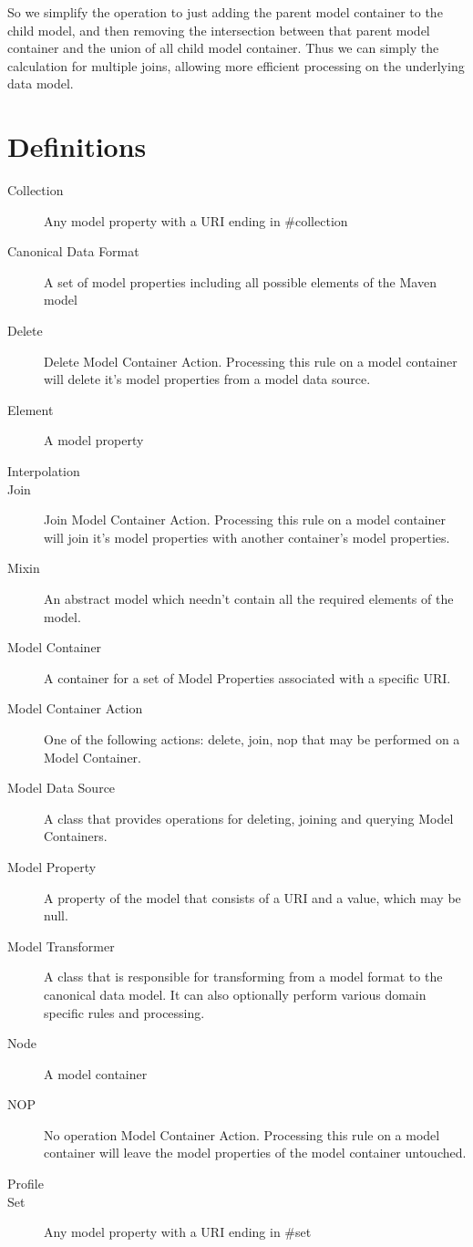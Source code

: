 \documentclass[12pt]{amsart}
\begin{document}
So we simplify the operation to just adding the parent model container to the child model, and then removing the intersection between that parent model container and the union of all child model container. Thus we can simply the calculation for multiple joins, allowing more efficient processing on the underlying data model.

\appendix
\section{Definitions}
\begin{description}
\item[Collection] Any model property with a URI ending in \#collection
\item[Canonical Data Format] A set of model properties including all possible elements of the Maven model
\item[Delete] Delete Model Container Action. Processing this rule on a model container will delete it's model properties from a model data source.
\item[Element] A model property
\item[Interpolation] 
\item[Join] Join Model Container Action. Processing this rule on a model container will join it's model properties with another container's model properties.
\item[Mixin]  An abstract model which needn't contain all the required elements of the model.
\item[Model Container]  A container for a set of Model Properties associated with a specific URI.
\item[Model Container Action]  One of the following actions: delete, join, nop that may be performed on a  Model Container.
\item[Model Data Source] A class that provides operations for deleting, joining and querying Model Containers.
\item[Model Property]  A property of the model that consists of a URI and a value, which may be null.
\item[Model Transformer]  A class that is responsible for transforming from a model format to the 
canonical data model. It can also optionally perform various domain specific rules and processing.
\item[Node] A model container
\item[NOP] No operation Model Container Action. Processing this rule on a model container will leave the model properties of the model container untouched.
\item[Profile] 
\item[Set] Any model property with a URI ending in \#set
\end{description}
\end{document}
